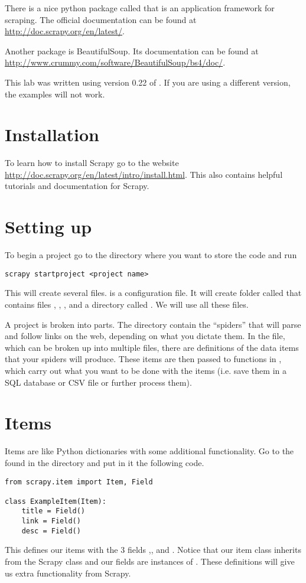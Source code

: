 There is a nice python package called  that is an application framework for scraping.
The official documentation can be found at \url{http://doc.scrapy.org/en/latest/}. 

Another package is BeautifulSoup. Its documentation can be found at \url{http://www.crummy.com/software/BeautifulSoup/bs4/doc/}.

\begin{warn}
This lab was written using version 0.22 of . 
If you are using a different version, the examples will not work.
\end{warn}

\section*{Installation}
To learn how to install Scrapy go to the website \url{http://doc.scrapy.org/en/latest/intro/install.html}. 
This also contains helpful tutorials and documentation for Scrapy.

\section*{Setting up}
To begin a project go to the directory where you want to store the code and run
\begin{lstlisting}
scrapy startproject <project name>
\end{lstlisting}
This will create several files.  is a configuration file. 
It will create folder called  that contains files , , , and a directory called . 
We will use all these files.

A  project is broken into parts. 
The  directory contain the ``spiders'' that will parse and follow links on the web, depending on what you dictate them.
In the  file, which can be broken up into multiple files, there are definitions of the data items that your spiders will produce. 
These items are then passed to functions in , which carry out what you want to be done with the items (i.e. save them in a SQL database or CSV file or further process them).

\section*{Items}
Items are like Python dictionaries with some additional functionality. 
Go to the  found in the  directory and put in it the following code.
\begin{lstlisting}
from scrapy.item import Item, Field

class ExampleItem(Item):
    title = Field()
    link = Field()
    desc = Field()
\end{lstlisting}
This defines our items with the 3 fields ,, and . 
Notice that our item class inherits from the Scrapy class  and our fields are instances of . 
These definitions will give us extra functionality from Scrapy.

